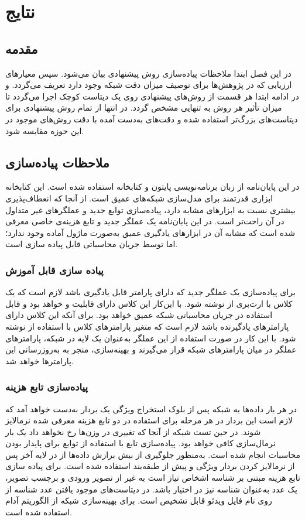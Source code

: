 \chapter{نتایج}
\label{chap:results}
\section{مقدمه} 
در این فصل ابتدا ملاحظات پیاده‌سازی روش پیشنهادی بیان می‌شود. سپس معیارهای ارزیابی که در پژوهش‌ها برای توصیف میزان دقت شبکه وجود دارد تعریف می‌گردد. و در ادامه ابتدا هر قسمت از روش‌های پیشنهادی روی یک دیتاست کوچک اجرا می‌گردد تا میزان تأثیر هر روش به تنهایی مشخص گردد. در انتها از تمام روش پیشنهادی برای دیتاست‌های بزرگ‌تر استفاده شده و دقت‌های به‌دست آمده با دقت روش‌های موجود در این حوزه مقایسه شود.
\section{ملاحظات پیاده‌سازی}
در این پایان‌نامه از زبان برنامه‌نویسی پایتون و کتابخانه  استفاده شده است. این کتابخانه ابزاری قدرتمند برای مدل‌سازی شبکه‌های عمیق است. از آنجا که  انعطاف‌پذیری بیشتری نسبت به ابزارهای مشابه دارد، پیاده‌سازی توابع جدید و عملگرهای غیر متداول در آن راحت‌تر است. در این پایان‌نامه یک عملگر جدید  و تابع هزینه‌ی خاصی معرفی شده است که مشابه آن در ابزارهای یادگیری عمیق به‌صورت ماژول آماده وجود ندارد؛ اما توسط جریان محاسباتی  قابل پیاده سازی است. 
\subsection{پیاده سازی  قابل آموزش}
برای پیاده‌سازی یک عملگر جدید که دارای پارامتر قابل یادگیری باشد لازم است که یک کلاس با ارث‌بری از  نوشته شود. با این‌کار این کلاس دارای قابلیت  و  خواهد بود و قابل استفاده در جریان محاسباتی شبکه عمیق خواهد بود.
برای آنکه این کلاس دارای پارامترهای یادگیرنده باشد لازم است که متغیر پارامترهای کلاس با استفاده از  نوشته شود. با این کار در صورت استفاده از این عملگر به‌عنوان یک لایه در شبکه، پارامترهای عملگر  در میان پارامترهای شبکه قرار می‌گیرند و بهینه‌سازی، منجر به به‌روزرسانی این پارامترها خواهد شد.
\subsection{پیاده‌سازی تابع هزینه}
در هر بار  داده‌ها به شبکه پس از بلوک استخراج ویژگی یک بردار به‌دست خواهد آمد که لازم است این بردار در هر مرحله برای استفاده در دو تابع هزینه معرفی شده نرمالایز شوند. در حین تست شبکه از آنجا که تغییری در وزن‌ها رخ نخواهد داد یک بار نرمال‌سازی کافی خواهد بود. پیاده‌سازی تابع  با استفاده از توابع  برای پایدار بودن محاسبات انجام شده است. به‌منظور جلوگیری از بیش برازش داده‌ها از 
\cite{srivastava2014dropout}
در لایه آخر پس از نرمالایز کردن بردار ویژگی و پیش از طبقه‌بند استفاده شده است. 
برای پیاده سازی تابع هزینه مبتنی بر شناسه اشخاص نیاز است به غیر از تصویر ورودی و برچسب تصویر، یک عدد به‌عنوان شناسه نیز در اختیار باشد. در دیتاست‌های موجود یافتن عدد شناسه از روی نام فایل ویدئو قابل تشخیص است. برای بهینه‌سازی شبکه از الگوریتم آدام 
\cite{kingma2014adam}
استفاده شده است.

